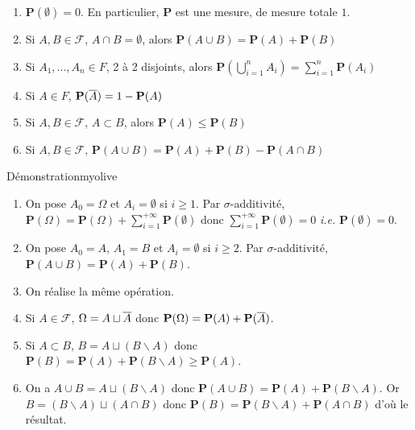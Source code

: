     \begin{prop}{}{}
        \begin{enumerate}
            \item $\mathbf{P}(\emptyset) = 0$. En particulier, $\mathbf{P}$ est une mesure, de mesure totale $1$.
            \item Si $A,B \in \mathcal{F}$, $A \cap B = \emptyset$, alors $\mathbf{P}(A \cup B) = \mathbf{P}(A) + \mathbf{P}(B)$
            \item Si $A_1, \ldots, A_n \in F$, 2 à 2 disjoints, alors $\mathbf{P}\left(\bigcup_{i=1}^n A_i\right) = \sum_{i =1}^n \mathbf{P}(A_i)$
            \item Si $A \in F$, $\mathbf{P}(\overline{A}) = 1 - \mathbf{P}(A)$
            \item Si $A, B \in \mathcal{F}$, $A \subset B$, alors $\mathbf{P}(A) \leq \mathbf{P}(B)$
            \item Si $A, B \in \mathcal{F}$, $\mathbf{P}(A \cup B) = \mathbf{P}(A) + \mathbf{P}(B) - \mathbf{P}(A \cap B)$
        \end{enumerate}
    \end{prop}

    \begin{demo}{Démonstration}{myolive}
        \begin{enumerate}
            \item On pose $A_0 = \Omega$ et $A_i = \emptyset$ si $i \geq 1$. Par $\sigma$-additivité, $\mathbf{P}(\Omega) = \mathbf{P}(\Omega) + \sum_{i=1}^{+\infty} \mathbf{P}(\emptyset)$ donc $\sum_{i=1}^{+\infty} \mathbf{P}(\emptyset) = 0$ \textit{i.e.} $\mathbf{P}(\emptyset) = 0$.
            \item On pose $A_0 = A$, $A_1 = B$ et $A_i = \emptyset$ si $i \geq 2$. Par $\sigma$-additivité, $\mathbf{P}(A \cup B) = \mathbf{P}(A) + \mathbf{P}(B)$.
            \item On réalise la même opération.
            \item Si $A \in \mathcal{F}$, $\Omega = A \sqcup \overline{A}$ donc $\mathbf{P}(\Omega) = \mathbf{P}(A) + \mathbf{P}(\overline{A})$.
            \item Si $A \subset B$, $B = A \sqcup (B \backslash A)$ donc $\mathbf{P}(B) = \mathbf{P}(A) + \mathbf{P}(B \backslash A) \geq \mathbf{P}(A)$.
            \item On a $A \cup B = A \sqcup (B \backslash A)$ donc $\mathbf{P}(A \cup B) = \mathbf{P}(A) + \mathbf{P}(B \backslash A)$. Or $B = (B \backslash A) \sqcup (A \cap B)$ donc $\mathbf{P}(B) = \mathbf{P}(B \backslash A) + \mathbf{P}(A \cap B)$ d’où le résultat.
        \end{enumerate}
    \end{demo}

